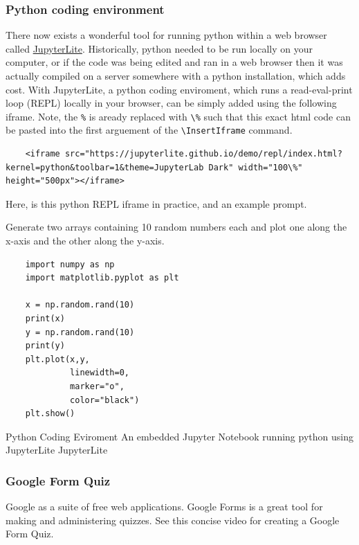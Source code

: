 \documentclass{article}
\begin{document}
\subsubsection{Python coding environment}
There now exists a wonderful tool for running python within a web browser called \href{https://jupyterlite.readthedocs.io/en/stable/#}{JupyterLite}. Historically, python needed to be run locally on your computer, or if the code was being edited and ran in a web browser then it was actually compiled on a server somewhere with a python installation, which adds cost. With JupyterLite, a python coding enviroment, which runs a read-eval-print loop (REPL) locally in your browser, can be simply added using the following iframe. Note, the \verb'%' is aready replaced with \verb'\%' such that this exact html code can be pasted into the first arguement of the \verb'\InsertIframe' command.
\begin{verbatim}
    <iframe src="https://jupyterlite.github.io/demo/repl/index.html?kernel=python&toolbar=1&theme=JupyterLab Dark" width="100\%" height="500px"></iframe>
\end{verbatim}
Here, is this python REPL iframe in practice, and an example prompt.

Generate two arrays containing 10 random numbers each and plot one along the x-axis and the other along the y-axis.
\begin{verbatim}
    import numpy as np
    import matplotlib.pyplot as plt
    
    x = np.random.rand(10)
    print(x)
    y = np.random.rand(10)
    print(y)
    plt.plot(x,y, 
             linewidth=0, 
             marker="o", 
             color="black")
    plt.show()
\end{verbatim}

              {Python Coding Eviroment}
              {An embedded Jupyter Notebook running python using JupyterLite}
              {JupyterLite}


\subsubsection{Google Form Quiz}
Google as a suite of free web applications. Google Forms is a great tool for making and administering quizzes. See this concise video for creating a Google Form Quiz.

\end{document}

